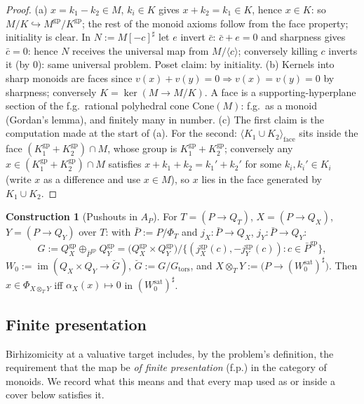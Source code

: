 \documentclass[11pt]{article}
\theoremstyle{definition}
\newtheorem{construction}[theorem]{Construction}
\newcommand{\gp}{\mathrm{gp}}
\newcommand{\sat}{\mathrm{sat}}
\newcommand{\Cone}{\mathrm{Cone}}
\begin{document}
\begin{proof}
(a) $x=k_1-k_2\in M$, $k_i\in K$ gives $x+k_2=k_1\in K$, hence
$x\in K$: so $M/K\hookrightarrow M^{\gp}/K^{\gp}$; the rest of the
monoid axioms follow from the face property; initiality is clear.
In $N:=M[-c]^{\sharp}$ let $e$ invert $\bar c$: $\bar c+e=0$ and
sharpness gives $\bar c=0$: hence $N$ receives the universal map from
$M/\langle c\rangle$; conversely killing $c$ inverts it (by $0$): same
universal problem. Poset claim: by initiality.
(b) Kernels into sharp monoids are faces since $v(x)+v(y)=0\Rightarrow
v(x)=v(y)=0$ by sharpness; conversely $K=\ker(M\to M/K)$. A face is a
supporting-hyperplane section of the f.g.\ rational polyhedral cone
$\Cone(M)$: f.g.\ as a monoid (Gordan's lemma), and finitely many in
number.
(c) The first claim is the computation made at the start of (a).
For the second: $\langle K_1\cup K_2\rangle_{\mathrm{face}}$ sits
inside the face $(K_1^{\gp}+K_2^{\gp})\cap M$, whose group is
$K_1^{\gp}+K_2^{\gp}$; conversely any $x\in(K_1^{\gp}+K_2^{\gp})\cap
M$ satisfies $x+k_1+k_2=k_1'+k_2'$ for some $k_i,k_i'\in K_i$ (write
$x$ as a difference and use $x\in M$), so $x$ lies in the face
generated by $K_1\cup K_2$.
\end{proof}

\begin{construction}[Pushouts in $A_P$]\label{constr:pushout}
For $T=(P\to Q_T)$, $X=(P\to Q_X)$, $Y=(P\to Q_Y)$ over $T$: with
$\bar P:=P/\Phi_T$ and $j_X:\bar P\to Q_X$, $j_Y:\bar P\to Q_Y$:
\[
G:=Q_X^{\gp}\oplus_{\bar P^{\gp}}Q_Y^{\gp}
=\bigl(Q_X^{\gp}\times Q_Y^{\gp}\bigr)\big/
\bigl\{(j_X^{\gp}(c),-j_Y^{\gp}(c)) : c\in\bar P^{\gp}\bigr\},
\]
$W_0:=\operatorname{im}(Q_X\times Q_Y\to\breve G)$,
$\breve G:=G/G_{\mathrm{tors}}$, and
$X\otimes_TY:=\bigl(P\to (W_0^{\sat})^{\sharp}\bigr)$. Then
$x\in\Phi_{X\otimes_TY}$ iff $\alpha_X(x)\mapsto0$ in
$(W_0^{\sat})^{\sharp}$.
\end{construction}

\subsection{Finite presentation}\label{ssec:fp}

Birhizomicity at a valuative target includes, by the problem's
definition, the requirement that the map be \emph{of finite
presentation} (f.p.) in the category of monoids. We record what
this means and that every map used as or inside a cover below
satisfies it.
\end{document}
